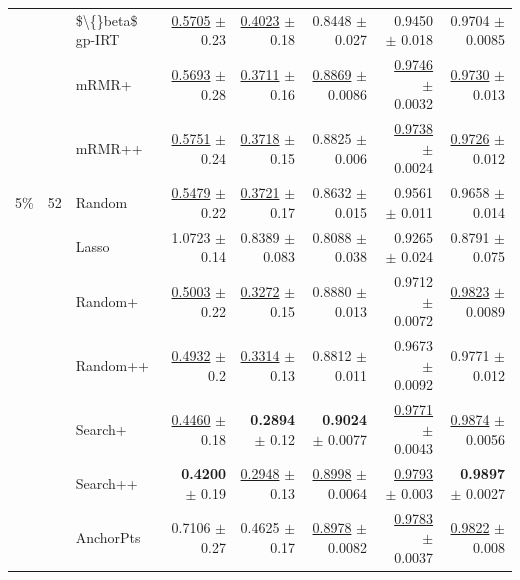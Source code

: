 \begin{longtable}{llp{}rrrrr}
 &  & \$\textbackslash\{\}beta\$ gp-IRT & \underline{0.5705} {\scriptsize $\pm$ 0.23} & \underline{0.4023} {\scriptsize $\pm$ 0.18} & 0.8448 {\scriptsize $\pm$ 0.027} & 0.9450 {\scriptsize $\pm$ 0.018} & 0.9704 {\scriptsize $\pm$ 0.0085} \\
 &  & mRMR+ & \underline{0.5693} {\scriptsize $\pm$ 0.28} & \underline{0.3711} {\scriptsize $\pm$ 0.16} & \underline{0.8869} {\scriptsize $\pm$ 0.0086} & \underline{0.9746} {\scriptsize $\pm$ 0.0032} & \underline{0.9730} {\scriptsize $\pm$ 0.013} \\
 &  & mRMR++ & \underline{0.5751} {\scriptsize $\pm$ 0.24} & \underline{0.3718} {\scriptsize $\pm$ 0.15} & 0.8825 {\scriptsize $\pm$ 0.006} & \underline{0.9738} {\scriptsize $\pm$ 0.0024} & \underline{0.9726} {\scriptsize $\pm$ 0.012} \\
\midrule
5\% & 52 & Random & \underline{0.5479} {\scriptsize $\pm$ 0.22} & \underline{0.3721} {\scriptsize $\pm$ 0.17} & 0.8632 {\scriptsize $\pm$ 0.015} & 0.9561 {\scriptsize $\pm$ 0.011} & 0.9658 {\scriptsize $\pm$ 0.014} \\
 &  & Lasso & 1.0723 {\scriptsize $\pm$ 0.14} & 0.8389 {\scriptsize $\pm$ 0.083} & 0.8088 {\scriptsize $\pm$ 0.038} & 0.9265 {\scriptsize $\pm$ 0.024} & 0.8791 {\scriptsize $\pm$ 0.075} \\
 &  & Random+ & \underline{0.5003} {\scriptsize $\pm$ 0.22} & \underline{0.3272} {\scriptsize $\pm$ 0.15} & 0.8880 {\scriptsize $\pm$ 0.013} & 0.9712 {\scriptsize $\pm$ 0.0072} & \underline{0.9823} {\scriptsize $\pm$ 0.0089} \\
 &  & Random++ & \underline{0.4932} {\scriptsize $\pm$ 0.2} & \underline{0.3314} {\scriptsize $\pm$ 0.13} & 0.8812 {\scriptsize $\pm$ 0.011} & 0.9673 {\scriptsize $\pm$ 0.0092} & 0.9771 {\scriptsize $\pm$ 0.012} \\
 &  & Search+ & \underline{0.4460} {\scriptsize $\pm$ 0.18} & \textbf{0.2894} {\scriptsize $\pm$ 0.12} & \textbf{0.9024} {\scriptsize $\pm$ 0.0077} & \underline{0.9771} {\scriptsize $\pm$ 0.0043} & \underline{0.9874} {\scriptsize $\pm$ 0.0056} \\
 &  & Search++ & \textbf{0.4200} {\scriptsize $\pm$ 0.19} & \underline{0.2948} {\scriptsize $\pm$ 0.13} & \underline{0.8998} {\scriptsize $\pm$ 0.0064} & \underline{0.9793} {\scriptsize $\pm$ 0.003} & \textbf{0.9897} {\scriptsize $\pm$ 0.0027} \\
 &  & AnchorPts & 0.7106 {\scriptsize $\pm$ 0.27} & 0.4625 {\scriptsize $\pm$ 0.17} & \underline{0.8978} {\scriptsize $\pm$ 0.0082} & \underline{0.9783} {\scriptsize $\pm$ 0.0037} & \underline{0.9822} {\scriptsize $\pm$ 0.008} \\

\end{longtable}
